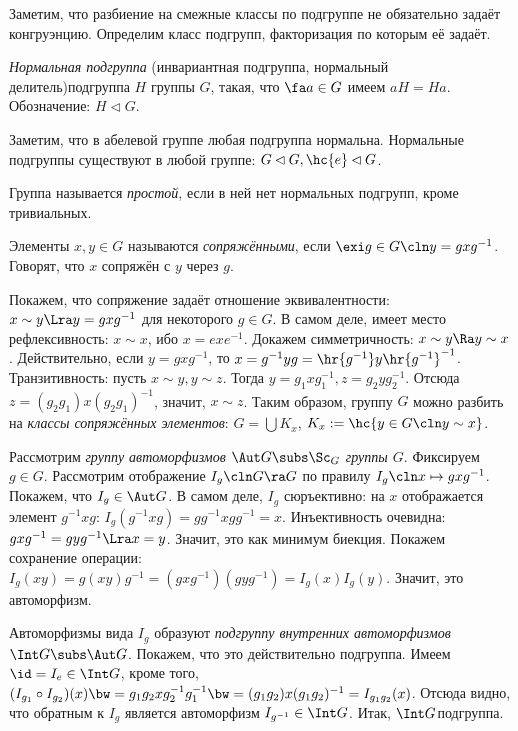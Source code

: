 \documentclass[a4paper]{article}
\begin{document}
Заметим, что разбиение на смежные классы по подгруппе не обязательно задаёт конгруэнцию. Определим класс
подгрупп, факторизация по которым её задаёт.

\begin{df}
\emph{Нормальная подгруппа} (инвариантная подгруппа, нормальный
делитель)\т подгруппа $H$ группы $G$, такая, что $\fa a \in G$
имеем $aH=Ha$. Обозначение: $H \lhd G$.
\end{df}

Заметим, что в абелевой группе любая подгруппа нормальна.
Нормальные подгруппы существуют в любой группе:
$G \lhd G, \hc{e} \lhd G$.

\begin{df}
Группа называется \emph{простой}, если в ней нет нормальных подгрупп, кроме тривиальных.
\end{df}

\begin{df}
Элементы $x,y \in G$ называются \emph{сопряжёнными}, если $\exi g \in G\cln y=gxg^{-1}$. Говорят, что
$x$ сопряжён с $y$ через $g$.
\end{df}

Покажем, что сопряжение задаёт отношение эквивалентности: $x\sim y \Lra y=gxg^{-1}$ для некоторого $g \in G$.
В самом деле, имеет место рефлексивность: $x \sim x$, ибо $x=exe^{-1}$. Докажем симметричность: $x \sim y \Ra
y \sim x$.  Действительно, если $y=gxg^{-1}$, то $x=g^{-1}yg=\hr{g^{-1}} y \hr{g^{-1}}^{-1}$. Транзитивность:
пусть $x \sim y, y \sim z$. Тогда $y=g_1xg_1^{-1}, z=g_2yg_2^{-1}$. Отсюда $z=(g_2g_1)x(g_2g_1)^{-1}$,
значит, $x \sim z$. Таким образом, группу $G$ можно разбить на \emph{классы сопряжённых элементов}:
$G = \bigcup K_x$, $K_x := \hc{y \in G\cln y \sim x}$.

Рассмотрим \emph{группу автоморфизмов $\Aut G \subs \Sc_G$ группы $G$}. Фиксируем  $g \in G$. Рассмотрим
отображение $I_g\cln G\ra G$ по правилу $I_g\cln x \mapsto gxg^{-1}$. Покажем, что $I_g \in \Aut G$. В самом деле,
$I_g$ сюръективно: на $x$ отображается элемент $g^{-1}xg$: $I_g(g^{-1}xg)=gg^{-1}xgg^{-1}=x$. Инъективность
очевидна: $gxg^{-1}=gyg^{-1} \Lra x=y$. Значит, это как минимум биекция. Покажем сохранение операции:
$I_g(xy)=g(xy)g^{-1}=(gxg^{-1})(gyg^{-1})=I_g(x)I_g(y)$. Значит, это автоморфизм.

\begin{df}
Автоморфизмы вида $I_g$ образуют \emph{подгруппу внутренних автоморфизмов}  $\Int G \subs \Aut G$. Покажем,
что это действительно подгруппа. Имеем $\id = I_e \in \Int G$, кроме того, $(I_{g_1}\circ
I_{g_2})(x) \bw= g_1g_2xg_2^{-1}g_1^{-1} \bw= (g_1g_2)x(g_1g_2)^{-1}=I_{g_1g_2}(x)$. Отсюда  видно, что обратным к
$I_g$ является автоморфизм $I_{g^{-1}} \in \Int G$. Итак, $\Int G$\т подгруппа.
\end{df}
\end{document}
